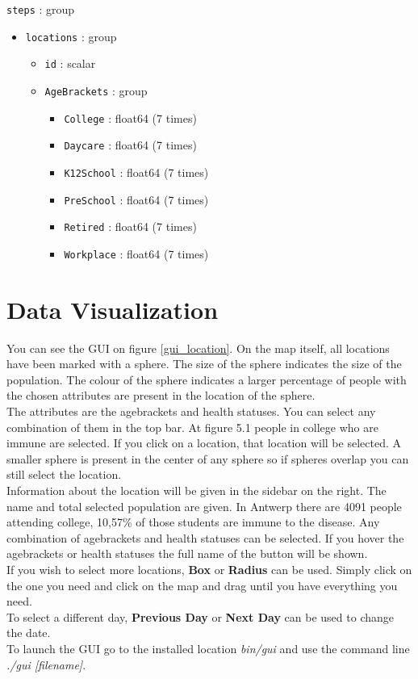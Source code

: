 \texttt{steps} : group
\begin{itemize}
\item \texttt{locations} : group
\begin{itemize}
\item \texttt{id} : scalar
\item \texttt{AgeBrackets} : group
\begin{itemize}
\item \texttt{College} : float64 (7 times)
\item \texttt{Daycare} : float64 (7 times)
\item \texttt{K12School} : float64 (7 times)
\item \texttt{PreSchool} : float64 (7 times)
\item \texttt{Retired} : float64 (7 times)
\item \texttt{Workplace} : float64 (7 times)
\end{itemize}
\end{itemize}
\end{itemize}

\section{Data Visualization}
You can see the GUI on figure \ref{gui_location}. On the map itself, all locations have been marked with a sphere. The size of the sphere indicates the size of the population. The colour of the sphere indicates a larger percentage of people with the chosen attributes are present in the location of the sphere. \\
The attributes are the agebrackets and health statuses. You can select any combination of them in the top bar. At figure 5.1 people in college who are immune are selected. If you click on a location, that location will be selected. A smaller sphere is present in the center of any sphere so if spheres overlap you can still select the location.\\ Information about the location will be given in the sidebar on the right. The name and total selected population are given. In Antwerp there are 4091 people attending college, 10,57\% of those students are immune to the disease. Any combination of agebrackets and health statuses can be selected. If you hover the agebrackets or health statuses the full name of the button will be shown. \\
If you wish to select more locations, \textbf{Box} or \textbf{Radius} can be used. Simply click on the one you need and click on the map and drag until you have everything you need.\\
To select a different day, \textbf{Previous Day} or \textbf{Next Day} can be used to change the date.\\
To launch the GUI go to the installed location \textit{bin/gui} and use the command line \textit{./gui [filename]}. 

